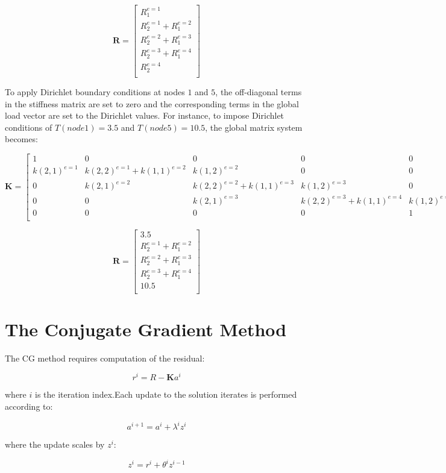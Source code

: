 \documentclass[10pt]{article}
\newcommand{\beq}{\begin{equation}}
\newcommand{\eeq}{\end{equation}}
\begin{document}
\beq
\textbf{R}=\begin{bmatrix}
R_1^{e=1} \\ R_2^{e=1}+R_1^{e=2}\\R_2^{e=2}+R_1^{e=3}\\R_2^{e=3}+R_1^{e=4}\\R_2^{e=4}\\
\end{bmatrix}
\eeq

To apply Dirichlet boundary conditions at nodes \(1\) and \(5\), the off-diagonal terms in the stiffness matrix are set to zero and the corresponding terms in the global load vector are set to the Dirichlet values. For instance, to impose Dirichlet conditions of \(T(node 1)=3.5\) and \(T(node 5) = 10.5\), the global matrix system becomes:

\beq
\textbf{K}=
\begin{bmatrix}
1 & 0 & 0 & 0 & 0\\
k(2, 1)^{e=1} & k(2, 2)^{e=1}+k(1, 1)^{e=2} & k(1, 2)^{e=2} & 0 & 0\\
0 & k(2, 1)^{e=2} & k(2, 2)^{e=2}+k(1, 1)^{e=3} & k(1, 2)^{e=3} & 0\\
0 & 0 & k(2, 1)^{e=3} & k(2, 2)^{e=3}+k(1, 1)^{e=4} & k(1, 2)^{e=4}\\
0 & 0 & 0 & 0 & 1\\
\end{bmatrix}
\eeq

\beq
\textbf{R}=\begin{bmatrix}
3.5\\ R_2^{e=1}+R_1^{e=2}\\R_2^{e=2}+R_1^{e=3}\\R_2^{e=3}+R_1^{e=4}\\10.5\\
\end{bmatrix}
\eeq

\section{The Conjugate Gradient Method}
The CG method requires computation of the residual:

\beq
r^i=R-\textbf{K}a^i
\eeq

where \(i\) is the iteration index.Each update to the solution iterates is performed according to:

\beq
\label{eq:CGUpdate}
a^{i+1}=a^i+\lambda^iz^i
\eeq

where the update scales by \(z^i\):

\beq
\label{eq:ZUpdateCG}
z^i=r^i+\theta^iz^{i-1}
\eeq
\end{document}
